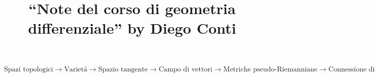 

\usepackage[english]{babel}


\title{``Note del corso di geometria differenziale'' by Diego Conti}


\maketitle

\begin{equation*}
  \boxed{
  \text{Spazi topologici}
  \to \text{Variet\'a}
  \to \text{Spazio tangente}
  \to \text{Campo di vettori}
  \to \text{Metriche pseudo-Riemanniane}
  \to \text{Connessione di Levi-Civita}
  \to \text{Curvatura}
}
\end{equation*}



